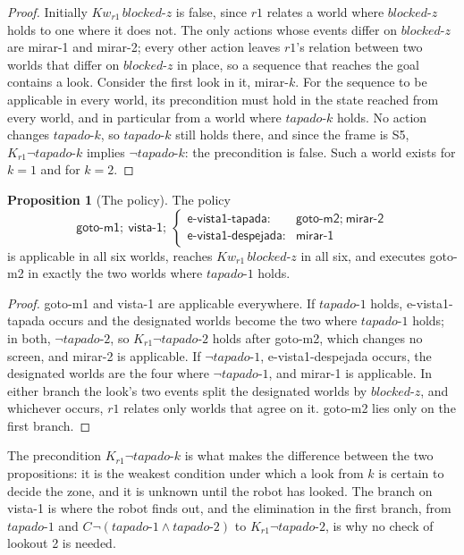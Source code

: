 \documentclass[11pt,a4paper]{article}
\theoremstyle{definition}
\newtheorem{proposition}{Proposition}
\newcommand{\Cop}[1]{C_{#1}}
\newcommand{\Kw}[1]{\mathit{Kw}_{#1}}
\newcommand{\tap}[1]{\mathit{tapado\text{-}#1}}
\newcommand{\bz}{\mathit{blocked\text{-}z}}
\newcommand{\act}[1]{\textsf{#1}}
\begin{document}
\begin{proof}
Initially $\Kw{r1}\,\bz$ is false, since $r1$ relates a world where $\bz$ holds
to one where it does not. The only actions whose events differ on $\bz$ are
\act{mirar-1} and \act{mirar-2}; every other action leaves $r1$'s relation
between two worlds that differ on $\bz$ in place, so a sequence that reaches the
goal contains a look. Consider the first look in it, \act{mirar-$k$}. For the
sequence to be applicable in every world, its precondition must hold in the
state reached from every world, and in particular from a world where $\tap{k}$
holds. No action changes $\tap{k}$, so $\tap{k}$ still holds there, and since
the frame is S5, $K_{r1}\neg\tap{k}$ implies $\neg\tap{k}$: the precondition is
false. Such a world exists for $k = 1$ and for $k = 2$.
\end{proof}

\begin{proposition}[The policy]
\label{prop:policy}
The policy
\[
\act{goto-m1};\ \act{vista-1};\
\begin{cases}
\act{e-vista1-tapada}: & \act{goto-m2};\ \act{mirar-2}\\
\act{e-vista1-despejada}: & \act{mirar-1}
\end{cases}
\]
is applicable in all six worlds, reaches $\Kw{r1}\,\bz$ in all six, and executes
\act{goto-m2} in exactly the two worlds where $\tap{1}$ holds.
\end{proposition}

\begin{proof}
\act{goto-m1} and \act{vista-1} are applicable everywhere. If $\tap{1}$ holds,
\act{e-vista1-tapada} occurs and the designated worlds become the two where
$\tap{1}$ holds; in both, $\neg\tap{2}$, so $K_{r1}\neg\tap{2}$ holds after
\act{goto-m2}, which changes no screen, and \act{mirar-2} is applicable. If
$\neg\tap{1}$, \act{e-vista1-despejada} occurs, the designated worlds are the
four where $\neg\tap{1}$, and \act{mirar-1} is applicable. In either branch the
look's two events split the designated worlds by $\bz$, and whichever occurs,
$r1$ relates only worlds that agree on it. \act{goto-m2} lies only on the first
branch.
\end{proof}

\noindent
The precondition $K_{r1}\neg\tap{k}$ is what makes the difference between the
two propositions: it is the weakest condition under which a look from $k$ is
certain to decide the zone, and it is unknown until the robot has looked. The
branch on \act{vista-1} is where the robot finds out, and the elimination in the
first branch, from $\tap{1}$ and $\Cop{}\neg(\tap{1} \wedge \tap{2})$ to
$K_{r1}\neg\tap{2}$, is why no check of lookout 2 is needed.
\end{document}
